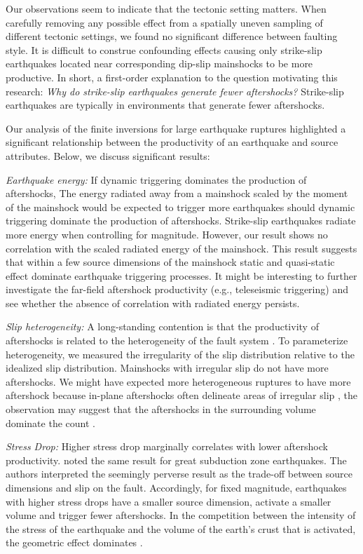\documentclass[12pt, notitlepage]{report}
\begin{document}
Our observations seem to indicate that the tectonic setting matters. When carefully removing any possible effect from a spatially uneven sampling of different tectonic settings, we found no significant difference between faulting style. It is difficult to construe confounding effects causing only strike-slip earthquakes located near corresponding dip-slip mainshocks to be more productive. In short, a first-order explanation to the question motivating this research: \textit{Why do strike-slip earthquakes generate fewer aftershocks?} Strike-slip earthquakes are typically in environments that generate fewer aftershocks.

Our analysis of the finite inversions for large earthquake ruptures highlighted a significant relationship between the productivity of an earthquake and source attributes. Below, we discuss significant results:

\textit{Earthquake energy:} If dynamic triggering dominates the production of aftershocks, The energy radiated away from a mainshock scaled by the moment of the mainshock would be expected to trigger more earthquakes should dynamic triggering dominate the production of aftershocks. Strike-slip earthquakes radiate more energy when controlling for magnitude. However, our result shows no correlation with the scaled radiated energy of the mainshock. This result suggests that within a few source dimensions of the mainshock static and quasi-static effect dominate earthquake triggering processes. It might be interesting to further investigate the far-field aftershock productivity (e.g., teleseismic triggering) and see whether the absence of correlation with radiated energy persists.

\textit{Slip heterogeneity:} A long-standing contention is that the productivity of aftershocks is related to the heterogeneity of the fault system \cite{Mogi1967EarthquakesFractures, Utsu1995}. To parameterize heterogeneity, we measured the irregularity of the slip distribution relative to the idealized slip distribution. Mainshocks with irregular slip do not have more aftershocks. We might have expected more heterogeneous ruptures to have more aftershock because in-plane aftershocks often delineate areas of irregular slip \cite{Yabe2018}, the observation may suggest that the aftershocks in the surrounding volume dominate the count \cite[consistent with][]{Wetzler2018SystematicEarthquakes}.

\textit{Stress Drop:} Higher stress drop marginally correlates with lower aftershock productivity. \textcite{Wetzler2016} noted the same result for great subduction zone earthquakes. The authors interpreted the seemingly perverse result as the trade-off between source dimensions and slip on the fault. Accordingly, for fixed magnitude, earthquakes with higher stress drops have a smaller source dimension, activate a smaller volume and trigger fewer aftershocks. In the competition between the intensity of the stress of the earthquake and the volume of the earth's crust that is activated, the geometric effect dominates \cite{Wetzler2016}. 
\end{document}
